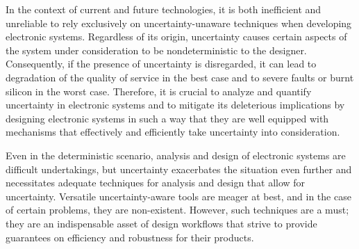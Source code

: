 In the context of current and future technologies, it is both inefficient and
unreliable to rely exclusively on uncertainty-unaware techniques when developing
electronic systems. Regardless of its origin, uncertainty causes certain aspects
of the system under consideration to be nondeterministic to the designer.
Consequently, if the presence of uncertainty is disregarded, it can lead to
degradation of the quality of service in the best case and to severe faults or
burnt silicon in the worst case. Therefore, it is crucial to analyze and
quantify uncertainty in electronic systems and to mitigate its deleterious
implications by designing electronic systems in such a way that they are well
equipped with mechanisms that effectively and efficiently take uncertainty into
consideration.

Even in the deterministic scenario, analysis and design of electronic systems
are difficult undertakings, but uncertainty exacerbates the situation even
further and necessitates adequate techniques for analysis and design that allow
for uncertainty. Versatile uncertainty-aware tools are meager at best, and in
the case of certain problems, they are non-existent. However, such techniques
are a must; they are an indispensable asset of design workflows that strive to
provide guarantees on efficiency and robustness for their products.
